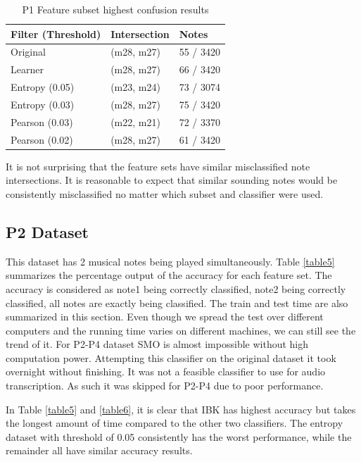 \documentclass{article}
\begin{document}
\begin{table}[h]
\begin{center}
\caption{P1 Feature subset highest confusion results}
 \label{table4}
\begin{tabular}{|C{2cm}|C{2cm}|C{2cm}|}
      \hline
          Filter (Threshold)& Intersection& Notes \\
         \hline
         Original & (m28, m27)  & 55 / 3420\\
         \hline
         Learner  & (m28, m27)  & 66 / 3420\\
          \hline
         Entropy (0.05) & (m23, m24) &73 / 3074\\
         \hline
         Entropy (0.03)  & (m28, m27)  & 75 / 3420\\
         \hline
         Pearson (0.03) & (m22, m21) & 72 / 3370\\
         \hline
         Pearson (0.02)  & (m28, m27)  & 61 / 3420\\
       \hline
\end{tabular}
\end{center}
\end{table}
It is not surprising that the feature sets have similar misclassified note intersections. It is reasonable to expect that similar sounding notes would be consistently misclassified no matter which subset and classifier were used. 


\subsection{P2 Dataset}
This dataset has 2 musical notes being played simultaneously. Table \ref{table5} summarizes the percentage output of the accuracy for each feature set. The accuracy is considered as note1 being correctly classified, note2 being correctly classified, all notes are exactly being classified. The train and test time are also summarized in this section. Even though we spread the test over different computers and the running time varies on different machines, we can still see the trend of it.  For P2-P4 dataset SMO is almost impossible without high computation power. Attempting this classifier on the original dataset it took overnight without finishing. It was not a feasible classifier to use for audio transcription. As such it was skipped for P2-P4 due to poor performance. 

In Table \ref{table5} and  \ref{table6}, it is clear that IBK has highest accuracy but takes the longest amount of time compared to the other two classifiers. The entropy dataset with threshold of 0.05 consistently has the worst performance, while the remainder all have similar accuracy results. 
\end{document}
